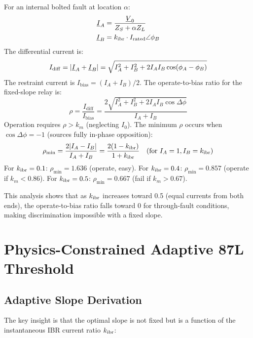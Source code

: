 For an internal bolted fault at location $\alpha$:
\begin{align}
  \underline{I}_A &= \frac{\underline{V}_0}{Z_S + \alpha Z_L}
  \label{eq:ch4_ia_fault} \\
  \underline{I}_B &= k_{\mathrm{ibr}} \cdot I_\mathrm{rated} \angle \phi_B
  \label{eq:ch4_ib_ibr}
\end{align}
The differential current is:
\begin{equation}
  I_\mathrm{diff} = |\underline{I}_A + \underline{I}_B|
    = \sqrt{I_A^2 + I_B^2 + 2I_A I_B \cos(\phi_A - \phi_B)}
  \label{eq:ch4_idiff_fault}
\end{equation}
The restraint current is $I_\mathrm{bias} = (I_A + I_B)/2$.
The operate-to-bias ratio for the fixed-slope relay is:
\begin{equation}
  \rho = \frac{I_\mathrm{diff}}{I_\mathrm{bias}} =
  \frac{2\sqrt{I_A^2 + I_B^2 + 2I_A I_B \cos\Delta\phi}}{I_A + I_B}
  \label{eq:ch4_rho}
\end{equation}
Operation requires $\rho > k_m$ (neglecting $I_0$). The minimum $\rho$
occurs when $\cos\Delta\phi = -1$ (sources fully in-phase opposition):
\begin{equation}
  \rho_\mathrm{min} = \frac{2|I_A - I_B|}{I_A + I_B}
  = \frac{2(1 - k_{\mathrm{ibr}})}{1 + k_{\mathrm{ibr}}} \quad (\text{for }I_A = 1, I_B = k_{\mathrm{ibr}})
  \label{eq:ch4_rho_min}
\end{equation}
For $k_{\mathrm{ibr}} = 0.1$: $\rho_\mathrm{min} = 1.636$ (operate, easy).
For $k_{\mathrm{ibr}} = 0.4$: $\rho_\mathrm{min} = 0.857$ (operate if $k_m < 0.86$).
For $k_{\mathrm{ibr}} = 0.5$: $\rho_\mathrm{min} = 0.667$ (fail if $k_m > 0.67$).

This analysis shows that as $k_{\mathrm{ibr}}$ increases toward 0.5 (equal currents
from both ends), the operate-to-bias ratio falls toward 0 for through-fault
conditions, making discrimination impossible with a fixed slope.

\section{Physics-Constrained Adaptive 87L Threshold}
\label{sec:ch4_adaptive}

\subsection{Adaptive Slope Derivation}

The key insight is that the optimal slope is not fixed but is a function
of the instantaneous IBR current ratio $k_{\mathrm{ibr}}$:

